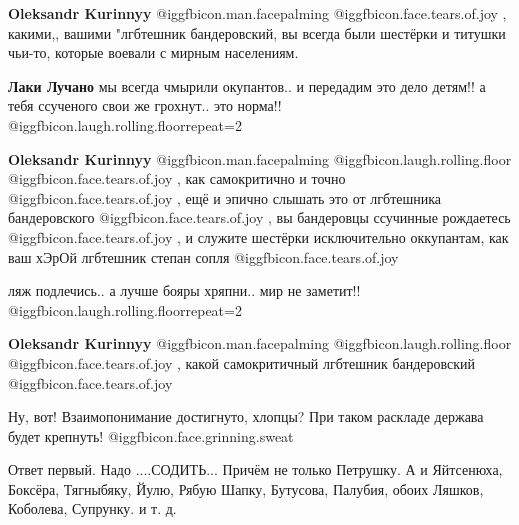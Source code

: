 \begin{itemize}
\begin{itemize}
\textbf{Oleksandr Kurinnyy}  @igg{fbicon.man.facepalming}  @igg{fbicon.face.tears.of.joy} , какими,, вашими "лгбтешник бандеровский, вы всегда были шестёрки и титушки чьи-то, которые воевали с мирным населениям.

\textbf{Лаки Лучано} мы всегда чмырили окупантов.. и передадим это дело детям!! а тебя ссученого свои же грохнут.. это норма!! @igg{fbicon.laugh.rolling.floor}{repeat=2} 

\textbf{Oleksandr Kurinnyy}  @igg{fbicon.man.facepalming}  @igg{fbicon.laugh.rolling.floor}  @igg{fbicon.face.tears.of.joy} , как самокритично и точно  @igg{fbicon.face.tears.of.joy} , ещё и эпично слышать это от лгбтешника бандеровского  @igg{fbicon.face.tears.of.joy} , вы бандеровцы ссучинные рождаетесь  @igg{fbicon.face.tears.of.joy} , и служите шестёрки исключительно оккупантам, как ваш хЭрОй лгбтешник степан сопля  @igg{fbicon.face.tears.of.joy} 

ляж подлечись.. а лучше бояры хряпни.. мир не заметит!! @igg{fbicon.laugh.rolling.floor}{repeat=2} 

\textbf{Oleksandr Kurinnyy}  @igg{fbicon.man.facepalming}  @igg{fbicon.laugh.rolling.floor}  @igg{fbicon.face.tears.of.joy} , какой самокритичный лгбтешник бандеровский  @igg{fbicon.face.tears.of.joy} 

Ну, вот! Взаимопонимание достигнуто, хлопцы? При таком раскладе держава будет крепнуть! @igg{fbicon.face.grinning.sweat} 
\end{itemize} %


Ответ первый. Надо ....СОДИТЬ... Причём не только Петрушку. А и Яйтсенюха,
Боксёра, Тягныбяку, Йулю, Рябую Шапку, Бутусова, Палубия, обоих Ляшков,
Коболева, Супрунку. и т. д.


\end{itemize} %
